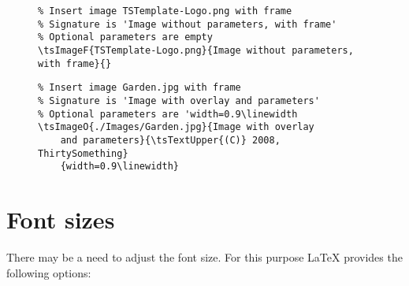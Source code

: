 
\begin{figure}[H]
    \small
    \centering
    \begin{BVerbatim}
\tsImageF{TSTemplate-Logo.png}{Image without parameters, with frame}{}
    \end{BVerbatim}
\end{figure}


\begin{figure}[H]
    \small
    \centering
    \begin{BVerbatim}
\tsImageO{./Images/Garden.jpg}{Image with overlay
    and parameters}{\tsTextUpper{(C)} 2008, ThirtySomething}
    {width=0.9\linewidth}
    \end{BVerbatim}
\end{figure}


\section{Font sizes}
\label{sec:Font sizes}

There may be a need to adjust the font size. For this purpose \LaTeX{} provides
the following options:

